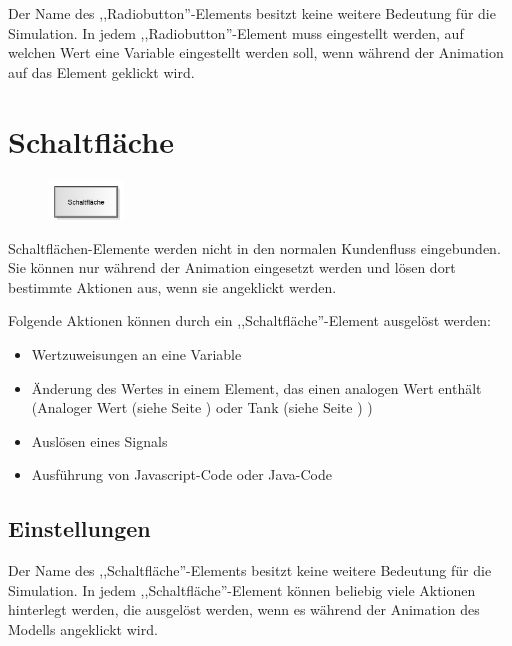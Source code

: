 Der Name des ,,Radiobutton''-Elements besitzt keine weitere Bedeutung für die Simulation.
In jedem ,,Radiobutton''-Element muss eingestellt werden, auf welchen Wert eine Variable
eingestellt werden soll, wenn während der Animation auf das Element geklickt wird.


\section{Schaltfläche}
\label{ref:ModelElementInteractiveButton}

\begin{figure}
\vspace{-22pt}
\includegraphics[width=2cm]{imageModelElementInteractiveButton.png}
\vspace{-22pt}
\end{figure}

Schaltflächen-Elemente werden nicht in den normalen Kundenfluss eingebunden.
Sie können nur während der Animation eingesetzt werden und lösen dort bestimmte
Aktionen aus, wenn sie angeklickt werden.

Folgende Aktionen können durch ein ,,Schaltfläche''-Element ausgelöst werden:

\begin{itemize}
  \item Wertzuweisungen an eine Variable 
  \item Änderung des Wertes in einem Element, das einen analogen Wert enthält
  (Analoger Wert (siehe Seite \pageref{ref:ModelElementAnalogValue}) oder Tank (siehe Seite \pageref{ref:ModelElementTank}) )
  \item Auslösen eines Signals 
  \item Ausführung von Javascript-Code oder Java-Code 
\end{itemize}

\subsection*{Einstellungen}

Der Name des ,,Schaltfläche''-Elements besitzt keine weitere Bedeutung für die Simulation.
In jedem ,,Schaltfläche''-Element können beliebig viele Aktionen hinterlegt werden, die
ausgelöst werden, wenn es während der Animation des Modells angeklickt wird.


